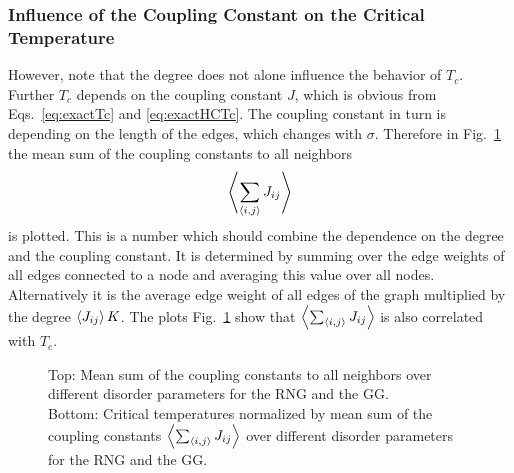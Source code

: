     \subsubsection{Influence of the Coupling Constant on the Critical Temperature}
    \label{sssec:J}
        However, note that the degree does not alone influence the behavior of \(T_c\).
        Further \(T_c\) depends on the coupling constant \(J\), which is
        obvious from Eqs.\ \eqref{eq:exactTc} and \eqref{eq:exactHCTc}. The
        coupling constant in turn is depending on the length of the edges,
        which changes with \(\sigma\).
        Therefore  in Fig.\ \ref{fig:TcJ}
        the mean sum of the coupling constants to all neighbors
        \begin{equation}
            \left< \sum_{\left< i,j \right>} J_{ij} \right>
        \end{equation}
        is plotted. This is a number which should combine the dependence on
        the degree and the coupling constant. It is determined by summing
        over the edge weights of all edges connected to a node and averaging
        this value over all nodes. Alternatively it is the average edge weight
        of all edges of the graph multiplied by the degree \(\left< J_{ij} \right> K\).
        The plots Fig.\ \ref{fig:TcJ}
        show that \(\left< \sum_{\left< i,j \right>} J_{ij} \right>\) is also correlated with \(T_c\).
        \begin{figure}[htbp]
            \centering


            \caption[Critical Temperature Normalized by Mean Sum of the Coupling Constants]
            {
                Top: Mean sum of the coupling constants to all
                neighbors over different disorder parameters for
                 the RNG and
                 the GG.\\
                Bottom: Critical temperatures normalized by mean sum of the
                coupling constants \(\left< \sum_{\left< i,j \right>} J_{ij} \right>\) over different
                disorder parameters for
                 the RNG and
                 the GG.
            }
            \label{fig:TcJ}
        \end{figure}\\
